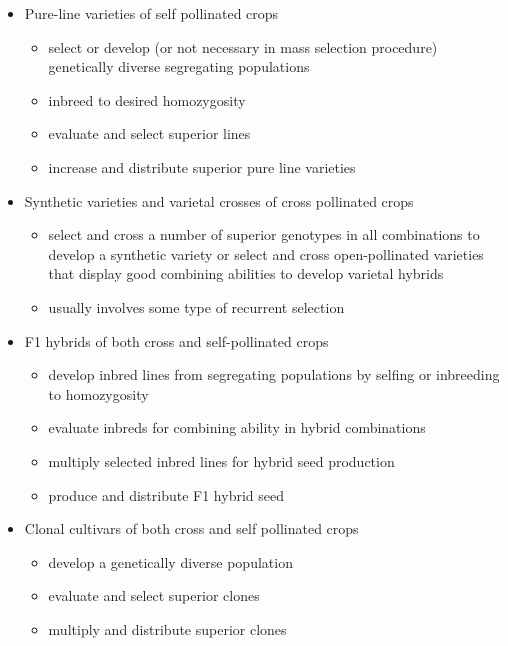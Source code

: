 \documentclass[11pt,ignorenonframetext,aspectratio=169]{beamer}
\providecommand{\tightlist}{%
  \setlength{\itemsep}{0pt}\setlength{\parskip}{0pt}}
\begin{document}
\begin{frame}{}
\protect\hypertarget{section-2}{}
\begin{itemize}
\tightlist
\item
  Pure-line varieties of self pollinated crops

  \begin{itemize}
  \tightlist
  \item
    select or develop (or not necessary in mass selection procedure)
    genetically diverse segregating populations
  \item
    inbreed to desired homozygosity
  \item
    evaluate and select superior lines
  \item
    increase and distribute superior pure line varieties
  \end{itemize}
\item
  Synthetic varieties and varietal crosses of cross pollinated crops

  \begin{itemize}
  \tightlist
  \item
    select and cross a number of superior genotypes in all combinations
    to develop a synthetic variety or select and cross open-pollinated
    varieties that display good combining abilities to develop varietal
    hybrids
  \item
    usually involves some type of recurrent selection
  \end{itemize}
\end{itemize}
\end{frame}

\begin{frame}{}
\protect\hypertarget{section-3}{}
\begin{itemize}
\tightlist
\item
  F1 hybrids of both cross and self-pollinated crops

  \begin{itemize}
  \tightlist
  \item
    develop inbred lines from segregating populations by selfing or
    inbreeding to homozygosity
  \item
    evaluate inbreds for combining ability in hybrid combinations
  \item
    multiply selected inbred lines for hybrid seed production
  \item
    produce and distribute F1 hybrid seed
  \end{itemize}
\item
  Clonal cultivars of both cross and self pollinated crops

  \begin{itemize}
  \tightlist
  \item
    develop a genetically diverse population
  \item
    evaluate and select superior clones
  \item
    multiply and distribute superior clones
  \end{itemize}
\end{itemize}
\end{frame}
\end{document}
